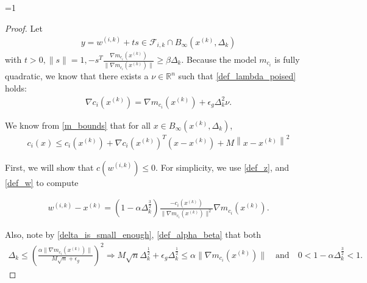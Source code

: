 \documentclass{article}
\theoremstyle{case}
\newcommand{\xk}{{x^{(k)}}}
\newcommand{\dk}{\Delta_k}
\newcommand{\zik}{{z^{(i, k)}}}
\newcommand{\fik}{{\mathcal F_{i, k}}}
\newcommand{\rn}{{\mathbb R^{n}}}
\newcommand{\wik}{{w^{(i, k)}}}
\newcommand{\gmcik}{{\nabla m_{c_i}(\xk)}}
\newcommand{\hgik}{{\frac{\nabla m_{c_i}(\xk)}{\|\nabla m_{c_i}(\xk)\|}}}
\newcommand{\tr}{{ B_{\infty}\left(\xk, \dk\right) }}
\def\includeproofs{1}
\begin{document}
\ifnum\includeproofs=1
\begin{proof}

Let 
\begin{align}
y = \wik + ts \in \fik \cap \tr \label{t_is_bounded}
\end{align}
with $t > 0, \|s\| = 1, -s^T\hgik \ge \beta \dk$.
Because the model $m_{c_i}$ is fully quadratic, we know that there exists a $\nu\in\rn$ such that \cref{def_lambda_poised} holds:
\begin{align}
\nabla c_i(\xk) = \nabla m_{c_i}(\xk) + \epsilon_{g}\dk^2\nu. \label{model_error_for_gradient}
\end{align}

We know from \cref{m_bounds} that for all $x \in \tr$,
\begin{align}
c_i(x) \le c_i(\xk) + \nabla c_i(\xk)^T(x - \xk) + M \left \|x - \xk \right\|^2 \label{constraint_lower_bound}
\end{align}

First, we will show that $c(\wik) \le 0$.
For simplicity, we use \cref{def_z}, and \cref{def_w} to compute


\begin{align}
\wik - \xk = \left(1 - \alpha \dk^{\frac 3 2 }\right)\frac{-c_i(\xk)}{\|\gmcik\|^2}\gmcik. \label{simple_computation}
\end{align}


Also, note by \cref{delta_is_small_enough}, \cref{def_alpha_beta} that both
\begin{align*}
\dk \le \left(\frac{\alpha \|\gmcik\|}{M \sqrt{n} + \epsilon_g}\right)^2 \Longrightarrow 
M \sqrt{n}\dk^{\frac 1 2} + \epsilon_g \dk^{\frac 1 2} \le \alpha \|\gmcik\| \quad \text{and} \quad
0 < 1 - \alpha \dk^{\frac 3 2 } < 1.
\end{align*}


\end{proof}
\end{document}

